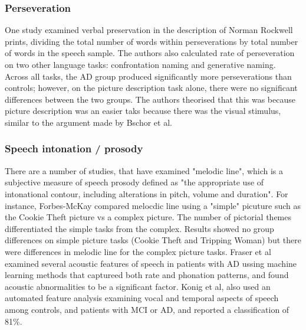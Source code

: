 \documentclass{article}
\begin{document}
\subsubsection{Perseveration}
One study examined verbal preservation in the description of Norman Rockwell prints, dividing the total number of words within perseverations by total number of words in the speech sample. The authors also calculated rate of perseveration on two other language tasks: confrontation naming and generative naming. Across all tasks, the AD group produced significantly more perseverations than controls; however, on the picture description task alone, there were no significant differences between the two groups. The authors theorised that this was because picture description was an easier taks because there was the visual stimulus, similar to the argument made by Bschor et al. \newline
\par
\subsubsection{Speech intonation / prosody}
There are a number of studies, that have examined "melodic line", which is a subjective measure of speech prosody defined as "the appropriate use of intonational contour, including alterations in pitch, volume and duration". For instance, Forbes-McKay compared melocdic line using a "simple" picuture such as the Cookie Theft picture vs a complex picture. The number of pictorial themes differentiated the simple tasks from the complex. Results showed no group differences on simple picture tasks (Cookie Theft and Tripping Woman) but there were differences in melodic line for the complex picture tasks. Fraser et al examined several acoustic features of speech in patients with AD ussing machine learning methods that captureed both rate and phonation patterns, and found acoustic abnormalities to be a significant factor. Konig et al, also used an automated feature analysis examining vocal and temporal aspects of speech among controls, and patients with MCI or AD, and reported a classification of 81\%.
\end{document}

